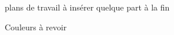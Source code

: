 \bigskip

{\red plans de travail à insérer quelque part à la fin \par
Couleurs à revoir}

\ \\ [10mm]

\vfill

\pagebreak

\newcommand\gm[2]{\rput(2,#1){\begin{minipage}{6cm}\centering\textcolor{Green}{#2}\end{minipage}}}
\newcommand\nc[2]{\rput(6,#1){\begin{minipage}{7cm} \centering\textcolor{Red}{#2}\end{minipage}}}
\newcommand\eg[2]{\rput(10,#1){\begin{minipage}{6cm}\centering\textcolor{DodgerBlue}{#2}\end{minipage}}}
\newcommand\ogd[2]{\rput(14,#1){\begin{minipage}{6cm}\centering\textcolor{violet}{#2}\end{minipage}}}

